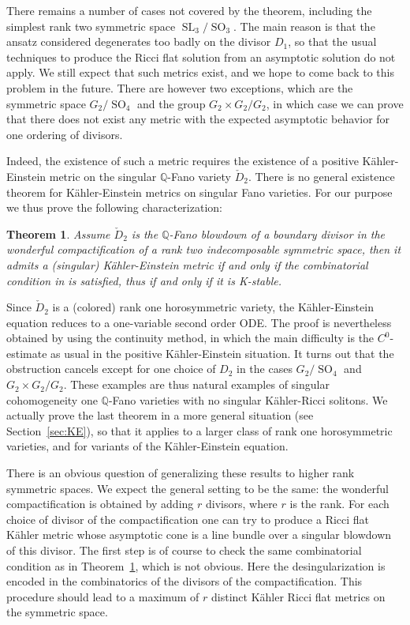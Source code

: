 \documentclass[10pt]{amsart}
\theoremstyle{plain}
\newtheorem{thm}{Theorem}[section]
\theoremstyle{definition}
\DeclareMathOperator{\SL}{SL}
\DeclareMathOperator{\SO}{SO}
\begin{document}
There remains a number of cases not covered by the theorem, including the simplest
rank two symmetric space $\SL_3/\SO_3$. The main reason is that the ansatz considered
degenerates too badly on the divisor $D_1$, so that the usual techniques to produce
the Ricci flat solution from an asymptotic solution do not apply. We still expect
that such metrics exist, and we hope to come back to this problem in the future. There are however two exceptions, which are the symmetric
space $G_2/\SO_4$ and the group $G_2\times G_2/G_2$, in which case we can prove that
there does not exist any metric with the expected asymptotic behavior for one ordering
of divisors.

Indeed, the existence of such a metric requires the existence of a positive Kähler-Einstein
metric on the singular $\mathbb{Q}$-Fano variety $\check{D}_2$. There is no general existence
theorem for Kähler-Einstein metrics on singular Fano varieties.
For our purpose we thus prove the following characterization:

\begin{thm}\label{th:2}
Assume $\check{D}_2$ is the $\mathbb{Q}$-Fano blowdown of a boundary divisor in the
wonderful compactification of a rank two indecomposable symmetric space, then
it admits a (singular) Kähler-Einstein metric if and only if the combinatorial
condition in \cite{DelKSSV} is satisfied, thus if and only if it is K-stable.
\end{thm}

Since $\check{D}_2$ is a (colored) rank one horosymmetric variety,
the Kähler-Einstein equation reduces to a one-variable second order ODE.
The proof is nevertheless obtained by using the continuity method,
in which the main difficulty is the $C^0$-estimate as usual in the positive
Kähler-Einstein situation.
It turns out that the obstruction cancels except for one choice of $D_2$ in the
cases $G_2/\SO_4$ and $G_2\times G_2/G_2$. These examples are thus natural examples
of singular cohomogeneity one $\mathbb{Q}$-Fano varieties with no singular Kähler-Ricci
solitons.
We actually prove the last theorem in a more general situation (see Section~\ref{sec:KE}),
so that it applies to a larger class of rank one horosymmetric varieties,
and for variants of the Kähler-Einstein equation.

There is an obvious question of generalizing these results to higher rank symmetric spaces. We expect the general setting to be the same: the wonderful compactification is obtained by adding $r$ divisors, where $r$ is the rank. For each choice of divisor of the compactification one can try to produce a Ricci flat Kähler metric whose asymptotic cone is a line bundle over a singular blowdown of this divisor. The first step is of course to check the same combinatorial condition as in Theorem~\ref{th:2}, which is not obvious. Here the desingularization is encoded in the combinatorics of the divisors of the compactification. This procedure should lead to a maximum of $r$ distinct Kähler Ricci flat metrics on the symmetric space.
\end{document}
